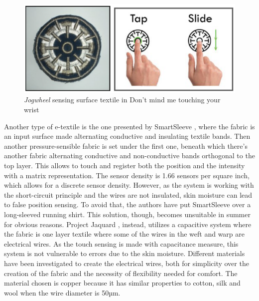 \documentclass{sigchi}
\begin{document}
\begin{figure}
  \includegraphics[width=\columnwidth]{jogwheel.png}
  \caption{\emph{Jogwheel} sensing surface textile in Don't mind me touching your wrist}
  \label{fig:1}
\end{figure}
%
%
Another type of e-textile is the one presented by SmartSleeve \cite{smart-sleeve}, where the fabric is an input surface made alternating conductive and insulating textile bands. Then another pressure-sensible fabric is set under the first one, beneath which there’s another fabric alternating conductive and non-conductive bands  orthogonal to the top layer. This allows to touch and register both the position and the intensity with a matrix representation. The sensor density is 1.66 sensors per square inch, which allows for a discrete sensor density. However, as the system is working with the short-circuit principle and the wires are not insulated, skin moisture can lead to false position sensing. To avoid that, the authors have put SmartSleeve over a long-sleeved running shirt. This solution, though, becomes unsuitable in summer for obvious reasons. %
%
Project Jaquard \cite{jacquard}, instead, utilizes a capacitive system where the fabric is one layer textile where some of the wires in the weft and warp are electrical wires. As the touch sensing is made with capacitance measure, this system is not vulnerable to errors due to the skin moisture. Different materials have been investigated to create the electrical wires, both for simplicity over the creation of the fabric and the necessity of flexibility needed for comfort. The material chosen is copper because it has similar properties to cotton, silk and wool when the wire diameter is 50µm.
%
%
%
\end{document}
